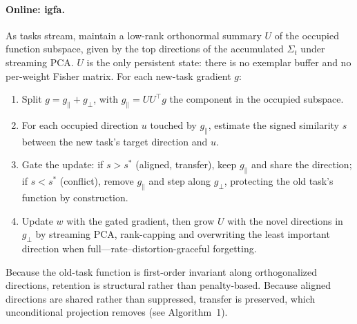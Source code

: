 \documentclass[10pt,a4paper]{article}
\theoremstyle{plain}
\theoremstyle{definition}
\newcommand{\Sig}{\Sigma}
\newcommand{\sstar}{s^{\ast}}
\newcommand{\IGFA}{igfa}
\begin{document}
\paragraph{Online: \IGFA.} As tasks stream, maintain a low-rank orthonormal summary
$U$ of the occupied function subspace, given by the top directions of the accumulated
$\Sig_t$ under streaming PCA. $U$ is the only persistent state: there is no exemplar
buffer and no per-weight Fisher matrix. For each new-task gradient $g$:
\begin{enumerate}[leftmargin=1.5em,itemsep=0pt]
\item Split $g=g_\parallel+g_\perp$, with $g_\parallel=UU^\top g$ the component in the
occupied subspace.
\item For each occupied direction $u$ touched by $g_\parallel$, estimate the signed
similarity $s$ between the new task's target direction and $u$.
\item Gate the update: if $s>\sstar$ (aligned, transfer), keep $g_\parallel$ and share
the direction; if $s<\sstar$ (conflict), remove $g_\parallel$ and step along $g_\perp$,
protecting the old task's function by construction.
\item Update $w$ with the gated gradient, then grow $U$ with the novel directions in
$g_\perp$ by streaming PCA, rank-capping and overwriting the least important direction
when full---rate--distortion-graceful forgetting.
\end{enumerate}
Because the old-task function is first-order invariant along orthogonalized directions,
retention is structural rather than penalty-based. Because aligned directions are
shared rather than suppressed, transfer is preserved, which unconditional projection
removes (see Algorithm~1).
\end{document}
